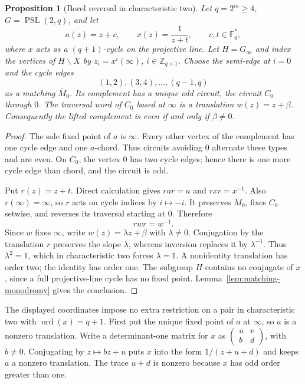 \documentclass[11pt,a4paper]{article}
\newtheorem{proposition}[theorem]{Proposition}
\theoremstyle{definition}
\theoremstyle{remark}
\newcommand{\ord}{\operatorname{ord}}
\newcommand{\PSL}{\operatorname{PSL}}
\newcommand{\ZZ}{\mathbb{Z}}
\begin{document}
\begin{proposition}[Borel reversal in characteristic two]\label{prop:borel-reversal}
Let $q=2^m\ge4$, $G=\PSL(2,q)$, and let
\[
 a(z)=z+c,\qquad x(z)=\frac{1}{z+t},\qquad c,t\in\mathbb F_q^*,
\]
where $x$ acts as a $(q+1)$-cycle on the projective line.  Let $H=G_\infty$ and index the vertices of $H\backslash X$ by $z_i=x^i(\infty)$, $i\in\ZZ_{q+1}$.  Choose the semi-edge at $i=0$ and the cycle edges
\[
 (1,2),(3,4),\ldots,(q-1,q)
\]
as a matching $\bar M_0$.  Its complement has a unique odd circuit, the circuit $C_0$ through $0$.  The traversal word of $C_0$ based at $\infty$ is a translation $w(z)=z+\beta$.  Consequently the lifted complement is even if and only if $\beta\ne0$.
\end{proposition}
\begin{proof}
The sole fixed point of $a$ is $\infty$.  Every other vertex of the complement has one cycle edge and one $a$-chord.  Thus circuits avoiding $0$ alternate these types and are even.  On $C_0$, the vertex $0$ has two cycle edges; hence there is one more cycle edge than chord, and the circuit is odd.

Put $r(z)=z+t$.  Direct calculation gives $rar=a$ and $rxr=x^{-1}$.  Also $r(\infty)=\infty$, so $r$ acts on cycle indices by $i\mapsto-i$.  It preserves $\bar M_0$, fixes $C_0$ setwise, and reverses its traversal starting at $0$.  Therefore
\[
 rwr=w^{-1}.
\]
Since $w$ fixes $\infty$, write $w(z)=\lambda z+\beta$ with $\lambda\ne0$.  Conjugation by the translation $r$ preserves the slope $\lambda$, whereas inversion replaces it by $\lambda^{-1}$.  Thus $\lambda^2=1$, which in characteristic two forces $\lambda=1$.  A nonidentity translation has order two; the identity has order one.  The subgroup $H$ contains no conjugate of $x$, since a full projective-line cycle has no fixed point.  Lemma~\ref{lem:matching-monodromy} gives the conclusion.
\end{proof}

The displayed coordinates impose no extra restriction on a pair in characteristic two with $\ord(x)=q+1$.  First put the unique fixed point of $a$ at $\infty$, so $a$ is a nonzero translation.  Write a determinant-one matrix for $x$ as $\left(\begin{smallmatrix}u&v\\b&d\end{smallmatrix}\right)$, with $b\ne0$.  Conjugating by $z\mapsto bz+u$ puts $x$ into the form $1/(z+u+d)$ and keeps $a$ a nonzero translation.  The trace $u+d$ is nonzero because $x$ has odd order greater than one.
\end{document}
